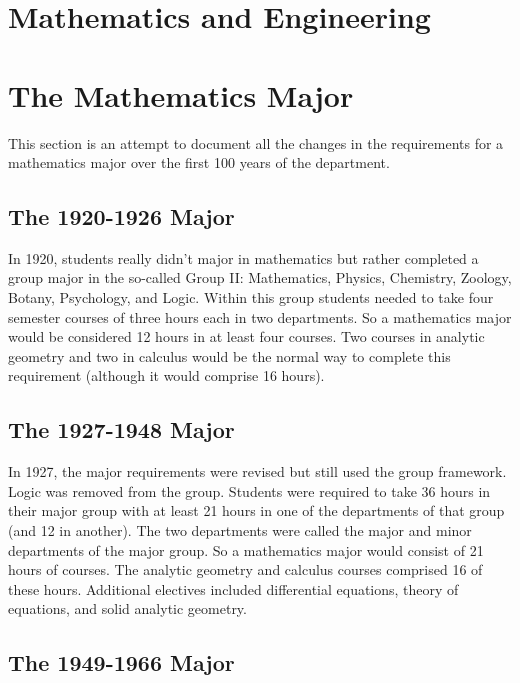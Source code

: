 \documentclass[
]{book}
\begin{document}
\hypertarget{mathematics-and-engineering}{%
\chapter{Mathematics and Engineering}\label{mathematics-and-engineering}}

\hypertarget{the-mathematics-major-1}{%
\chapter{The Mathematics Major}\label{the-mathematics-major-1}}

This section is an attempt to document all the changes in the requirements for a mathematics major over the first 100 years of the department.

\hypertarget{the-1920-1926-major}{%
\section{The 1920-1926 Major}\label{the-1920-1926-major}}

In 1920, students really didn't major in mathematics but rather completed a group major in the so-called Group II: Mathematics, Physics, Chemistry, Zoology, Botany, Psychology, and Logic. Within this group students needed to take four semester courses of three hours each in two departments. So a mathematics major would be considered 12 hours in at least four courses. Two courses in analytic geometry and two in calculus would be the normal way to complete this requirement (although it would comprise 16 hours).

\hypertarget{the-1927-1948-major}{%
\section{The 1927-1948 Major}\label{the-1927-1948-major}}

In 1927, the major requirements were revised but still used the group framework. Logic was removed from the group. Students were required to take 36 hours in their major group with at least 21 hours in one of the departments of that group (and 12 in another). The two departments were called the major and minor departments of the major group. So a mathematics major would consist of 21 hours of courses. The analytic geometry and calculus courses comprised 16 of these hours. Additional electives included differential equations, theory of equations, and solid analytic geometry.

\hypertarget{the-1949-1966-major}{%
\section{The 1949-1966 Major}\label{the-1949-1966-major}}
\end{document}
